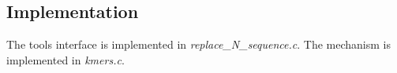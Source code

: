 \subsection{Implementation}
The tools interface is implemented in
\emph{replace\_N\_sequence.c}. The mechanism is implemented in
\emph{kmers.c}.


